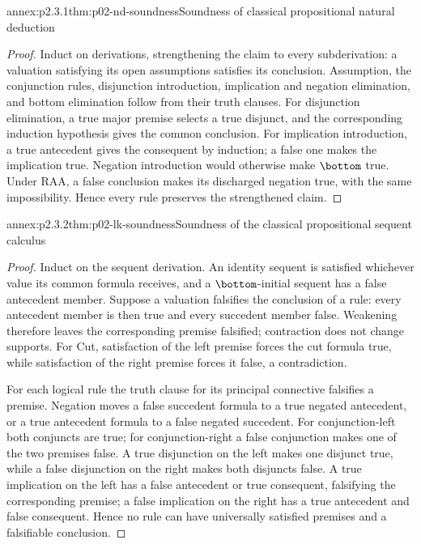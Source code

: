 
\begin{annexitem}{annex:p2.3.1}{thm:p02-nd-soundness}{Soundness of classical propositional natural deduction}
\begin{proof}
Induct on derivations, strengthening the claim to every subderivation: a
valuation satisfying its open assumptions satisfies its conclusion.
Assumption, the conjunction rules, disjunction introduction, implication and
negation elimination, and bottom elimination follow from their truth clauses.
For disjunction elimination, a true major premise selects a true disjunct, and
the corresponding induction hypothesis gives the common conclusion.
For implication introduction, a true antecedent gives the consequent by
induction; a false one makes the implication true.  Negation introduction
would otherwise make \(\bottom\) true.  Under RAA, a false conclusion makes
its discharged negation true, with the same impossibility.  Hence every rule
preserves the strengthened claim.
\end{proof}
\end{annexitem}

\begin{annexitem}{annex:p2.3.2}{thm:p02-lk-soundness}{Soundness of the classical propositional sequent calculus}
\begin{proof}
Induct on the sequent derivation.  An identity sequent is satisfied whichever
value its common formula receives, and a \(\bottom\)-initial sequent has a
false antecedent member.  Suppose a valuation falsifies the conclusion of a
rule: every antecedent member is then true and every succedent member false.
Weakening therefore leaves the corresponding premise falsified; contraction
does not change supports.  For Cut, satisfaction of the left premise forces
the cut formula true, while satisfaction of the right premise forces it
false, a contradiction.

For each logical rule the truth clause for its principal connective falsifies
a premise.  Negation moves a false succedent formula to a true negated
antecedent, or a true antecedent formula to a false negated succedent.
For conjunction-left both conjuncts are true; for conjunction-right a false
conjunction makes one of the two premises false.  A true disjunction on the
left makes one disjunct true, while a false disjunction on the right makes
both disjuncts false.  A true implication on the left has a false antecedent
or true consequent, falsifying the corresponding premise; a false implication
on the right has a true antecedent and false consequent.  Hence no rule can
have universally satisfied premises and a falsifiable conclusion.
\end{proof}
\end{annexitem}

